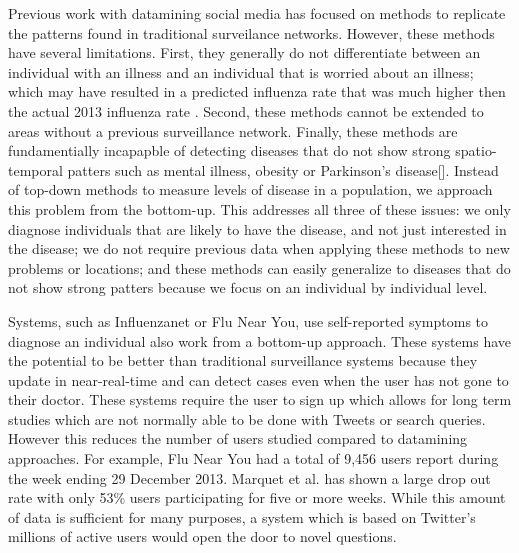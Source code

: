 \documentclass{acm_proc_article-sp}
\begin{document}
Previous work with datamining social media has focused on methods to replicate the patterns found in traditional surveilance networks\cite{Bodnar:2013we,Culotta:2010hx,Goel:2010jf}. However, these methods have several limitations. First, they generally do not differentiate between an individual with an illness and an individual that is worried about an illness; which may have resulted in a predicted influenza rate that was much higher then the actual 2013 influenza rate \cite{Bodnar:2013we,Butler:2013uh,Olson:2013bo,Lamb:2013to}. Second, these methods cannot be extended to areas without a previous surveillance network. Finally, these methods are fundamentially incapapble of detecting diseases that do not show strong spatio-temporal patters such as mental illness, obesity or Parkinson's disease[]. Instead of top-down methods to measure levels of disease in a population, we approach this problem from the bottom-up. This addresses all three of these issues: we only diagnose individuals that are likely to have the disease, and not just interested in the disease; we do not require previous data when applying these methods to new problems or locations; and these methods can easily generalize to diseases that do not show strong patters because we focus on an individual by individual level.

Systems, such as Influenzanet or Flu Near You, use self-reported symptoms to diagnose an individual also work from a bottom-up approach.\cite{Marquet:2005tb,VanNoort:2007uk} These systems have the potential to be better than traditional surveillance systems because they update in near-real-time and can detect cases even when the user has not gone to their doctor. These systems require the user to sign up which allows for long term studies which are not normally able to be done with Tweets or search queries. However this reduces the number of users studied compared to datamining approaches. For example, Flu Near You had a total of 9,456 users report during the week ending 29 December 2013. Marquet et al. \cite{Marquet:2005tb} has shown a large drop out rate with only 53\% users participating for five or more weeks. While this amount of data is sufficient for many purposes, a system which is based on Twitter's millions of active users would open the door to novel questions.


%
%
\end{document}
